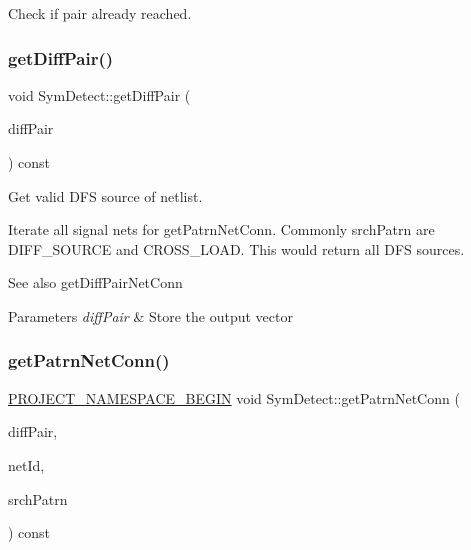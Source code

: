 Check if pair already reached. 

\mbox{\label{classSymDetect_af04b93dac7e090cef8e741d8d1812485}} 
\subsubsection{\texorpdfstring{get\+Diff\+Pair()}{getDiffPair()}}
{\footnotesize\ttfamily void Sym\+Detect\+::get\+Diff\+Pair (\begin{DoxyParamCaption}\item[{std\+::vector$<$ \hyperlink{structMosPair}{Mos\+Pair} $>$ \&}]{diff\+Pair }\end{DoxyParamCaption}) const\hspace{0.3cm}{\ttfamily [private]}}



Get valid D\+FS source of netlist. 

Iterate all signal nets for get\+Patrn\+Net\+Conn. Commonly srch\+Patrn are D\+I\+F\+F\+\_\+\+S\+O\+U\+R\+CE and C\+R\+O\+S\+S\+\_\+\+L\+O\+AD. This would return all D\+FS sources.

\begin{DoxySeeAlso}{See also}
get\+Diff\+Pair\+Net\+Conn 
\end{DoxySeeAlso}

\begin{DoxyParams}{Parameters}
{\em diff\+Pair} & Store the output vector \\
\hline
\end{DoxyParams}
\mbox{\label{classSymDetect_af7d1b22086aa98a27b1eafc9266596d8}} 
\subsubsection{\texorpdfstring{get\+Patrn\+Net\+Conn()}{getPatrnNetConn()}}
{\footnotesize\ttfamily \hyperlink{namespace_8h_ae48726a24dab2034454cf6d79e531eb8}{P\+R\+O\+J\+E\+C\+T\+\_\+\+N\+A\+M\+E\+S\+P\+A\+C\+E\+\_\+\+B\+E\+G\+IN} void Sym\+Detect\+::get\+Patrn\+Net\+Conn (\begin{DoxyParamCaption}\item[{std\+::vector$<$ \hyperlink{structMosPair}{Mos\+Pair} $>$ \&}]{diff\+Pair,  }\item[{\hyperlink{type_8h_a581e8093e28e7362f2b6937296190676}{Index\+Type}}]{net\+Id,  }\item[{\hyperlink{type_8h_af19eddb079bfea723256710b029c38e8}{Mos\+Pattern}}]{srch\+Patrn }\end{DoxyParamCaption}) const\hspace{0.3cm}{\ttfamily [private]}}



